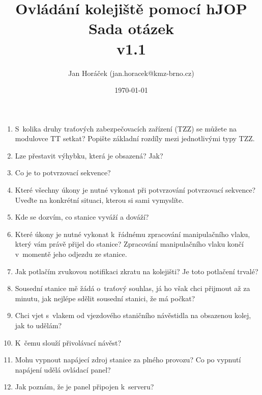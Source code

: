 \documentclass[12pt,a4paper]{article}
\begin{document}
\thispagestyle{empty}
\noindent

\title{
\Large Ovládání kolejiště pomocí hJOP\\
\LARGE Sada otázek\\
\small v1.1}
\author{Jan Horáček (jan.horacek@kmz-brno.cz)}
\date{\today}
\maketitle

\begin{enumerate}
	\item S~kolika druhy traťových zabezpečovacích zařízení (TZZ) se můžete na modulovce TT setkat? Popište základní rozdíly mezi jednotlivými typy TZZ.
	
	\item Lze přestavit výhybku, která je obsazená? Jak?
	
	\item Co je to potvrzovací sekvence?
	
	\item Které všechny úkony je nutné vykonat při potvrzování potvrzovací sekvence? Uveďte na konkrétní situaci, kterou si sami vymyslíte.
	
	\item Kde se dozvím, co stanice vyváží a dováží?
	
	\item Které úkony je nutné vykonat k~řádnému zpracování manipulačního vlaku, který vám právě přijel do stanice? Zpracování manipulačního vlaku končí v~momentě jeho odjezdu ze stanice.
	
	\item Jak potlačím zvukovou notifikaci zkratu na kolejišti? Je toto potlačení trvalé?
	
	\item Sousední stanice mě žádá o~traťový souhlas, já ho však chci přijmout až za minutu, jak nejlépe sdělit sousední stanici, že má počkat?
	
	\item Chci vjet s~vlakem od vjezdového staničního návěstidla na obsazenou kolej, jak to udělám?
	
	\item K~čemu slouží přivolávací návěst?
	
	\item Mohu vypnout napájecí zdroj stanice za plného provozu? Co po vypnutí napájení udělá ovládací panel?
	
	\item Jak poznám, že je panel připojen k~serveru?
	

\end{enumerate}
\end{document}
